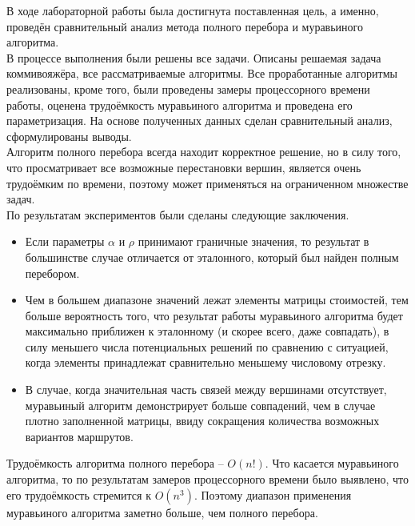 В ходе лабораторной работы была достигнута поставленная цель, а именно, проведён сравнительный анализ метода полного перебора и муравьиного алгоритма. \\

В процессе выполнения были решены все задачи. Описаны решаемая задача коммивояжёра, все рассматриваемые алгоритмы. Все проработанные алгоритмы реализованы, кроме того, были проведены замеры процессорного времени работы, оценена трудоёмкость муравьиного алгоритма и проведена его параметризация. На основе полученных данных сделан сравнительный анализ, сформулированы выводы.\\

Алгоритм полного перебора всегда находит корректное решение, но в силу того, что просматривает все возможные перестановки вершин, является очень трудоёмким по времени, поэтому может применяться на ограниченном множестве задач.\\

По результатам экспериментов были сделаны следующие заключения.
\begin{itemize}
	\item Если параметры $\alpha$ и $\rho$ принимают граничные значения, то результат в большинстве случае отличается от эталонного, который был найден полным перебором.
	\item Чем в большем диапазоне значений лежат элементы матрицы стоимостей, тем больше вероятность того, что результат работы муравьиного алгоритма будет максимально приближен к эталонному (и скорее всего, даже совпадать), в силу меньшего числа потенциальных решений по сравнению с ситуацией, когда элементы принадлежат сравнительно меньшему числовому отрезку.
	\item В случае, когда значительная часть связей между вершинами отсутствует, муравьиный алгоритм демонстрирует больше совпадений, чем в случае плотно заполненной матрицы, ввиду сокращения количества возможных вариантов маршрутов.
\end{itemize}

Трудоёмкость алгоритма полного перебора -- $O(n!)$. Что касается муравьиного алгоритма, то по результатам замеров процессорного времени было выявлено, что его трудоёмкость стремится к $O(n^3)$. Поэтому диапазон применения муравьиного алгоритма заметно больше, чем полного перебора.

